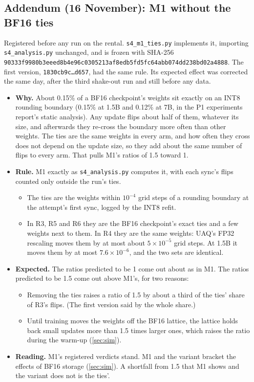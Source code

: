 \documentclass[11pt]{article}
\begin{document}
\subsection{Addendum (16 November): M1 without the BF16 ties}\label{sec:addendum}
Registered before any run on the rental. \texttt{s4\_m1\_ties.py} implements it, importing \texttt{s4\_analysis.py} unchanged, and is frozen with SHA-256 {\small\nolinkurl{90333f9980b3eeed8b4e96c0305213af8edb5fd5fc64abb074dd238bd02a4888}}. The first version, \texttt{1830cb9c\ldots d657}, had the same rule. Its expected effect was corrected the same day, after the third shake-out run and still before any data.
\begin{itemize}
\item \textbf{Why.} About 0.15\% of a BF16 checkpoint's weights sit exactly on an INT8 rounding boundary (0.15\% at 1.5B and 0.12\% at 7B, in the P1 experiments report's static analysis). Any update flips about half of them, whatever its size, and afterwards they re-cross the boundary more often than other weights. The ties are the same weights in every arm, and how often they cross does not depend on the update size, so they add about the same number of flips to every arm. That pulls M1's ratios of 1.5 toward 1.
\item \textbf{Rule.} M1 exactly as \texttt{s4\_analysis.py} computes it, with each sync's flips counted only outside the run's ties.
  \begin{itemize}
  \item The ties are the weights within $10^{-4}$ grid steps of a rounding boundary at the attempt's first sync, logged by the INT8 refit.
  \item In R3, R5 and R6 they are the BF16 checkpoint's exact ties and a few weights next to them. In R4 they are the same weights: UAQ's FP32 rescaling moves them by at most about $5\times10^{-5}$ grid steps. At 1.5B it moves them by at most $7.6\times10^{-6}$, and the two sets are identical.
  \end{itemize}
\item \textbf{Expected.} The ratios predicted to be 1 come out about as in M1. The ratios predicted to be 1.5 come out above M1's, for two reasons:
  \begin{itemize}
  \item Removing the ties raises a ratio of 1.5 by about a third of the ties' share of R3's flips. (The first version said by the whole share.)
  \item Until training moves the weights off the BF16 lattice, the lattice holds back small updates more than 1.5 times larger ones, which raises the ratio during the warm-up (\cref{sec:sim}).
  \end{itemize}
\item \textbf{Reading.} M1's registered verdicts stand. M1 and the variant bracket the effects of BF16 storage (\cref{sec:sim}). A shortfall from 1.5 that M1 shows and the variant does not is the ties'.
\end{itemize}
\end{document}
